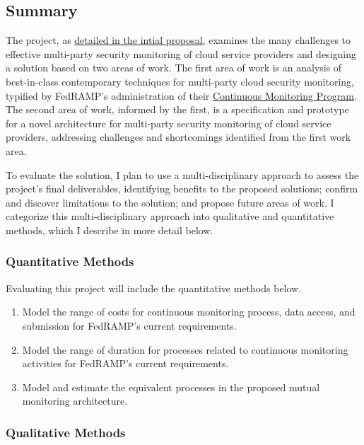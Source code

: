 \subsection*{Summary}

The project, as \hyperlink{https://github.com/aj-stein/practicum_proposal/blob/5238ba70dd8736320400ee6907b3fcfdd8ae672b/paper.pdf}{detailed in the intial proposal}, examines the many challenges to effective multi-party security monitoring of cloud service providers and designing a solution based on two areas of work. The first area of work is an analysis of best-in-class contemporary techniques for multi-party cloud security monitoring, typified by FedRAMP's administration of their \hyperlink{https://web.archive.org/web/20250616221039/https://www.fedramp.gov/assets/resources/documents/CSP_Continuous_Monitoring_Performance_Management_Guide.pdf}{Continuous Monitoring Program}. The second area of work, informed by the first, is a specification and prototype for a novel architecture for multi-party security monitoring of cloud service providers, addressing challenges and shortcomings identified from the first work area.

To evaluate the solution, I plan to use a multi-disciplinary approach to assess the project's final deliverables, identifying benefits to the proposed solutions; confirm and discover limitations to the solution; and propose future areas of work. I categorize this multi-disciplinary approach into qualitative and quantitative methods, which I describe in more detail below.

\subsubsection*{Quantitative Methods}

Evaluating this project will include the quantitative methods below.

\begin{enumerate}
  \item Model the range of costs for continuous monitoring process, data access, and submission for FedRAMP's current requirements.
  \item Model the range of duration for processes related to continuous monitoring activities for FedRAMP's current requirements.
  \item Model and estimate the equivalent processes in the proposed mutual monitoring architecture.
\end{enumerate}

\subsubsection*{Qualitative Methods}

